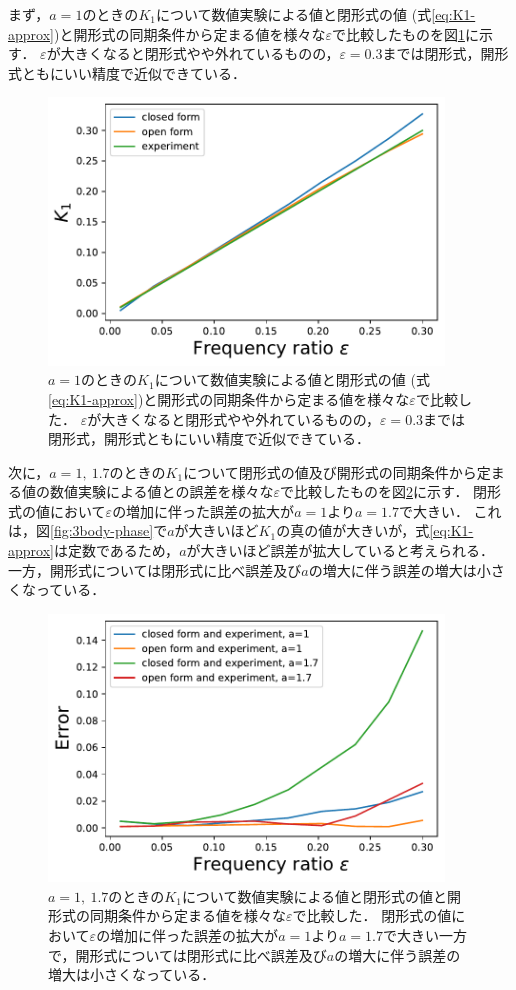 \documentclass[../main]{subfiles}
\begin{document}
まず，$a=1$のときの$K_1$について数値実験による値と閉形式の値 (式\eqref{eq:K1-approx})と開形式の同期条件から定まる値を様々な$\varepsilon$で比較したものを図\ref{fig:k1-compare}に示す．
$\varepsilon$が大きくなると閉形式やや外れているものの，$\varepsilon=0.3$までは閉形式，開形式ともにいい精度で近似できている．
\begin{figure}[tbp]
\centering
\includegraphics[width=105mm]{./images/k1-compare.pdf}
\centering
\caption{$a=1$のときの$K_1$について数値実験による値と閉形式の値 (式\eqref{eq:K1-approx})と開形式の同期条件から定まる値を様々な$\varepsilon$で比較した．
$\varepsilon$が大きくなると閉形式やや外れているものの，$\varepsilon=0.3$までは閉形式，開形式ともにいい精度で近似できている．}
\label{fig:k1-compare}
\end{figure}

次に，$a=1,\ 1.7$のときの$K_1$について閉形式の値及び開形式の同期条件から定まる値の数値実験による値との誤差を様々な$\varepsilon$で比較したものを図\ref{fig:k1-error}に示す．
閉形式の値において$\varepsilon$の増加に伴った誤差の拡大が$a=1$より$a=1.7$で大きい．
これは，図\ref{fig:3body-phase}で$a$が大きいほど$K_1$の真の値が大きいが，式\eqref{eq:K1-approx}は定数であるため，$a$が大きいほど誤差が拡大していると考えられる．
一方，開形式については閉形式に比べ誤差及び$a$の増大に伴う誤差の増大は小さくなっている．
\begin{figure}[tbp]
\centering
\includegraphics[width=105mm]{./images/k1-error.pdf}
\centering
\caption{$a=1,\ 1.7$のときの$K_1$について数値実験による値と閉形式の値と開形式の同期条件から定まる値を様々な$\varepsilon$で比較した．
閉形式の値において$\varepsilon$の増加に伴った誤差の拡大が$a=1$より$a=1.7$で大きい一方で，開形式については閉形式に比べ誤差及び$a$の増大に伴う誤差の増大は小さくなっている．}
\label{fig:k1-error}
\end{figure}
\end{document}
